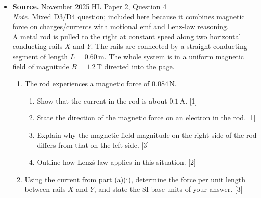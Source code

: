 \documentclass[11pt]{article}
\begin{document}
\begin{itemize}[leftmargin=1.25em]
\begin{enumerate}[label=(\alph*), leftmargin=1.5em]
\item Calculate the force per unit length on $R$ and identify its direction. [2+1]
\item The external field is removed and a second long wire $Z$, carrying current $I_Z$, is placed parallel to $R$.
\begin{enumerate}[label=(\roman*), leftmargin=1.5em]
\item Show that the magnetic field due to $R$ at distance $r$ is $B_R=\dfrac{\mu_0 I_R}{2\pi r}$. [2]
\item Derive the SI base units of $\mu_0$. [1]
\end{enumerate}
\item Later in the same question, an electron moves parallel to a rod $T$ at speed $9.0\times 10^5\,\text{m s}^{-1}$. When a switch is closed, the magnetic field at the electron is $4.0\times 10^{-6}\,\text{T}$.
\begin{enumerate}[label=(\roman*), leftmargin=1.5em]
\item Calculate the initial radius of curvature of the electron\'s path. [3]
\item Explain how the radius subsequently changes. [2]
\end{enumerate}
\end{enumerate}
\item
\textbf{Source.} November 2025 HL Paper 2, Question 4\\
\textit{Note.} Mixed D3/D4 question; included here because it combines magnetic force on charges/currents with motional emf and Lenz-law reasoning.\\
A metal rod is pulled to the right at constant speed along two horizontal conducting rails $X$ and $Y$. The rails are connected by a straight conducting segment of length $L=0.60\,\text{m}$. The whole system is in a uniform magnetic field of magnitude $B=1.2\,\text{T}$ directed into the page.

\begin{enumerate}[label=(\alph*), leftmargin=1.5em]
\item The rod experiences a magnetic force of $0.084\,\text{N}$.
\begin{enumerate}[label=(\roman*), leftmargin=1.5em]
\item Show that the current in the rod is about $0.1\,\text{A}$. [1]
\item State the direction of the magnetic force on an electron in the rod. [1]
\item Explain why the magnetic field magnitude on the right side of the rod differs from that on the left side. [3]
\item Outline how Lenz\'s law applies in this situation. [2]
\end{enumerate}
\item Using the current from part (a)(i), determine the force per unit length between rails $X$ and $Y$, and state the SI base units of your answer. [3]
\end{enumerate}
\end{itemize}
\end{document}

